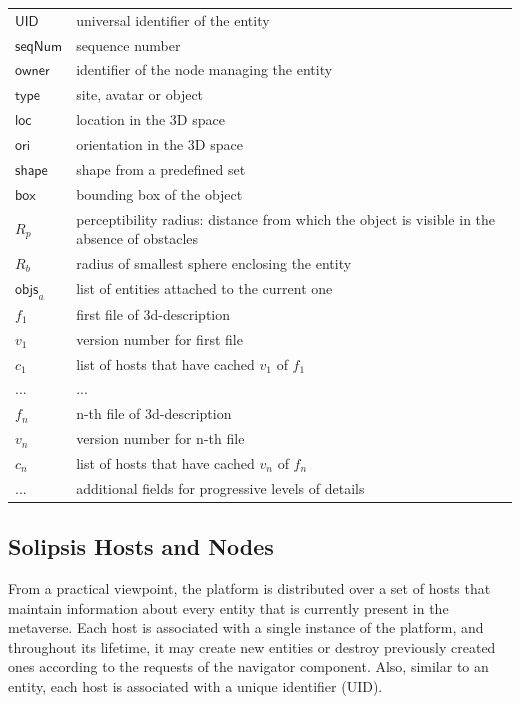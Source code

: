 
\begin{table}
\centering
\scriptsize
\begin{tabular}{|l|p{6cm}|}
\hline
  $\mathsf{UID}$ & universal identifier of the entity\\
  $\mathsf{seqNum}$ & sequence number\\
\hline
  $\mathsf{owner}$ & identifier of the node managing the entity\\
  $\mathsf{type}$ & site, avatar or object\\
  $\mathsf{loc}$ & location in the 3D space\\
  $\mathsf{ori}$ & orientation in the 3D space\\
  $\mathsf{shape}$& shape from a predefined set\\
  $\mathsf{box}$ & bounding box of the object\\
  $R_p$ & perceptibility radius: distance from which the object is
  visible in the absence of obstacles\\
  $R_b$ & radius of  smallest sphere enclosing the entity\\
  $\mathsf{objs}_a$ & list of entities attached to the current one\\
  \hline
  $f_1$ & first file of 3d-description \\
  $v_1$ & version number for first file\\
  $c_1$ & list of hosts that have cached $v_1$ of $f_1$\\
  ...& ...\\
  $f_n$& n-th file of 3d-description\\
  $v_n$& version number for n-th file\\
  $c_n$& list of hosts that have cached $v_n$ of $f_n$\\
  \hline
  ... & additional fields for progressive levels of details\\
  \hline
\end{tabular}
\label{tab:desc}
\end{table}

\subsection{Solipsis Hosts and Nodes}
From a practical viewpoint, the \sol platform is distributed over a
set of hosts that maintain information about every entity that is
currently present in the metaverse.  Each host is associated with a
single instance of the \sol platform, and throughout its lifetime, it
may create new entities or destroy previously created ones according
to the requests of the navigator component. Also, similar to an
entity, each host is associated with a unique identifier (UID).

